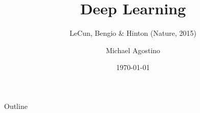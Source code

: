 \documentclass[10pt]{beamer}
\title{Deep Learning}
\subtitle{LeCun, Bengio \& Hinton (Nature, 2015)}
\author{Michael Agostino}
\institute{STAT 3494W}
\date{\today}
\begin{document}
\begin{frame}
    \titlepage
\end{frame}

\begin{frame}{Outline}
    \tableofcontents
\end{frame}








\end{document}
